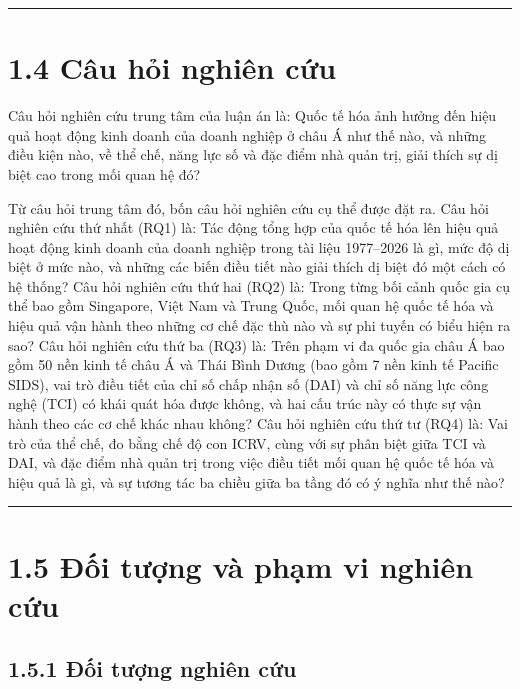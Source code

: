 \documentclass[
  a4paper,
  13pt]{extreport}
\begin{document}
\begin{center}\rule{0.5\linewidth}{0.5pt}\end{center}

\hypertarget{cuxe2u-hux1ecfi-nghiuxean-cux1ee9u}{%
\section{1.4 Câu hỏi nghiên
cứu}\label{cuxe2u-hux1ecfi-nghiuxean-cux1ee9u}}

Câu hỏi nghiên cứu trung tâm của luận án là: Quốc tế hóa ảnh hưởng đến
hiệu quả hoạt động kinh doanh của doanh nghiệp ở châu Á như thế nào, và
những điều kiện nào, về thể chế, năng lực số và đặc điểm nhà quản trị,
giải thích sự dị biệt cao trong mối quan hệ đó?

Từ câu hỏi trung tâm đó, bốn câu hỏi nghiên cứu cụ thể được đặt ra. Câu
hỏi nghiên cứu thứ nhất (RQ1) là: Tác động tổng hợp của quốc tế hóa lên
hiệu quả hoạt động kinh doanh của doanh nghiệp trong tài liệu 1977--2026
là gì, mức độ dị biệt ở mức nào, và những các biến điều tiết nào giải
thích dị biệt đó một cách có hệ thống? Câu hỏi nghiên cứu thứ hai (RQ2)
là: Trong từng bối cảnh quốc gia cụ thể bao gồm Singapore, Việt Nam và
Trung Quốc, mối quan hệ quốc tế hóa và hiệu quả vận hành theo những cơ
chế đặc thù nào và sự phi tuyến có biểu hiện ra sao? Câu hỏi nghiên cứu
thứ ba (RQ3) là: Trên phạm vi đa quốc gia châu Á bao gồm 50 nền kinh tế
châu Á và Thái Bình Dương (bao gồm 7 nền kinh tế Pacific SIDS), vai trò
điều tiết của chỉ số chấp nhận số (DAI) và chỉ số năng lực công nghệ
(TCI) có khái quát hóa được không, và hai cấu trúc này có thực sự vận
hành theo các cơ chế khác nhau không? Câu hỏi nghiên cứu thứ tư (RQ4)
là: Vai trò của thể chế, đo bằng chế độ con ICRV, cùng với sự phân biệt
giữa TCI và DAI, và đặc điểm nhà quản trị trong việc điều tiết mối quan
hệ quốc tế hóa và hiệu quả là gì, và sự tương tác ba chiều giữa ba tầng
đó có ý nghĩa như thế nào?

\begin{center}\rule{0.5\linewidth}{0.5pt}\end{center}

\hypertarget{ux111ux1ed1i-tux1b0ux1ee3ng-vuxe0-phux1ea1m-vi-nghiuxean-cux1ee9u}{%
\section{1.5 Đối tượng và phạm vi nghiên
cứu}\label{ux111ux1ed1i-tux1b0ux1ee3ng-vuxe0-phux1ea1m-vi-nghiuxean-cux1ee9u}}

\hypertarget{ux111ux1ed1i-tux1b0ux1ee3ng-nghiuxean-cux1ee9u}{%
\subsection{1.5.1 Đối tượng nghiên
cứu}\label{ux111ux1ed1i-tux1b0ux1ee3ng-nghiuxean-cux1ee9u}}
\end{document}
